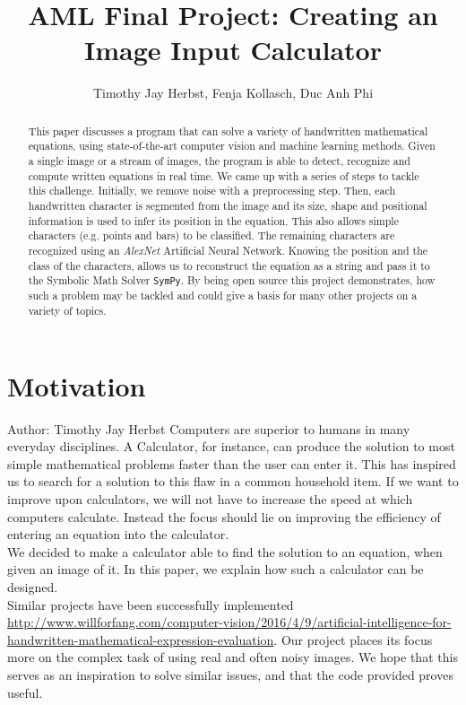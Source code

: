 \documentclass[12pt]{article}
\title{AML Final Project: Creating an Image Input Calculator} %
\author{Timothy Jay Herbst, Fenja Kollasch, Duc Anh Phi}
\begin{document}
	\maketitle
	
	\begin{abstract}
		This paper discusses a program that can solve a variety of handwritten mathematical equations, using state-of-the-art computer vision and machine learning methods.
		Given a single image or a stream of images, the program is able to detect, recognize and compute written equations in real time.
		We came up with a series of steps to tackle this challenge.
		Initially, we remove noise with a preprocessing step.
		Then, each handwritten character is segmented from the image and its size, shape and positional information is used to infer its position in the equation.
		This also allows simple characters (e.g. points and bars) to be classified.
		The remaining characters are recognized using an \textit{AlexNet} Artificial Neural Network.
		Knowing the position and the class of the characters, allows us to reconstruct the equation as a string and pass it to the Symbolic Math Solver \texttt{SymPy}.
		By being open source this project demonstrates, how such a problem may be tackled and could give a basis for many other projects on a variety of topics.
		
		
		
	\end{abstract}
	\newpage
	
	\tableofcontents
	
	\newpage
	\section{Motivation}
	\small{Author: Timothy Jay Herbst} \newline \newline
	Computers are superior to humans in many everyday disciplines.
	A Calculator, for instance, can produce the solution to most simple mathematical problems faster than the user can enter it.
	This has inspired us to search for a solution to this flaw in a common household item.
	If we want to improve upon calculators, we will not have to increase the speed at which computers calculate.
	Instead the focus should lie on improving the efficiency of entering an equation into the calculator.\\
	We decided to make a calculator able to find the solution to an equation, when given an image of it.
	In this paper, we explain how such a calculator can be designed.\\ Similar projects have been successfully implemented \url{http://www.willforfang.com/computer-vision/2016/4/9/artificial-intelligence-for-handwritten-mathematical-expression-evaluation}. Our project places its focus more on the complex task of using real and often noisy images.
	We hope that this serves as an inspiration to solve similar issues, and that the code provided proves useful.
	
\end{document}
